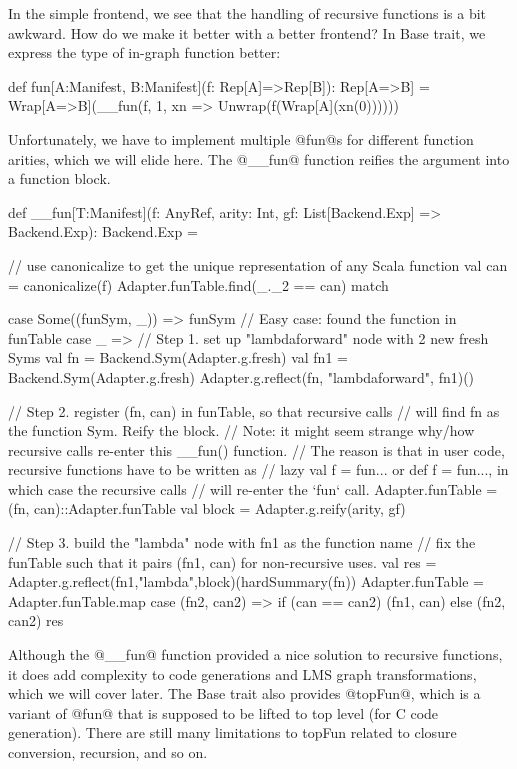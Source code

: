 In the simple frontend, we see that the handling of recursive functions is
a bit awkward. How do we make it better with a better frontend?
In Base trait, we express the type of in-graph function better:

\begin{listing}[scala]
def fun[A:Manifest, B:Manifest](f: Rep[A]=>Rep[B]): Rep[A=>B] =
    Wrap[A=>B](__fun(f, 1, xn => Unwrap(f(Wrap[A](xn(0))))))
\end{listing}

Unfortunately, we have to implement multiple @fun@s for different function
arities, which we will elide here. The @__fun@ function reifies the argument
into a function block.

\begin{listing}[scala]
def __fun[T:Manifest](f: AnyRef, arity: Int, gf: List[Backend.Exp] => Backend.Exp): Backend.Exp = {
    // use canonicalize to get the unique representation of any Scala function
    val can = canonicalize(f)
    Adapter.funTable.find(_._2 == can) match {
        case Some((funSym, _)) =>
            funSym // Easy case: found the function in funTable
        case _ =>
            // Step 1. set up "lambdaforward" node with 2 new fresh Syms
            val fn = Backend.Sym(Adapter.g.fresh)
            val fn1 = Backend.Sym(Adapter.g.fresh)
            Adapter.g.reflect(fn, "lambdaforward", fn1)()

            // Step 2. register (fn, can) in funTable, so that recursive calls
            //    will find fn as the function Sym. Reify the block.
            // Note: it might seem strange why/how recursive calls re-enter this __fun() function.
            //    The reason is that in user code, recursive functions have to be written as
            //    lazy val f = fun{...} or def f = fun{...}, in which case the recursive calls
            //    will re-enter the `fun` call.
            Adapter.funTable = (fn, can)::Adapter.funTable
            val block = Adapter.g.reify(arity, gf)

            // Step 3. build the "lambda" node with fn1 as the function name
            //    fix the funTable such that it pairs (fn1, can) for non-recursive uses.
            val res = Adapter.g.reflect(fn1,"lambda",block)(hardSummary(fn))
            Adapter.funTable = Adapter.funTable.map {
            case (fn2, can2) => if (can == can2) (fn1, can) else (fn2, can2)
            }
            res
    }
}
\end{listing}

Although the @__fun@ function provided a nice solution to recursive functions, it does
add complexity to code generations and LMS graph transformations, which we will cover later.
The Base trait also provides @topFun@, which is a variant of @fun@ that is supposed to be lifted
to top level (for C code generation). There are still many limitations to topFun related to closure
conversion, recursion, and so on.

